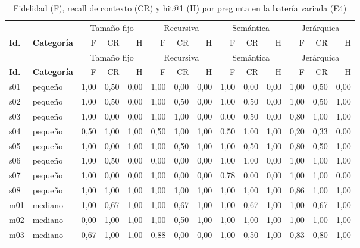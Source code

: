 \begin{footnotesize}
\setlength{\tabcolsep}{3pt}
\begin{longtable}{@{}l l rrr rrr rrr rrr@{}}
\caption{Fidelidad (F), recall de contexto (CR) y hit@1 (H) por pregunta en la batería variada (E4)}\label{tab:ap-e4}\\
\toprule
& & \multicolumn{3}{c}{Tamaño fijo} & \multicolumn{3}{c}{Recursiva} & \multicolumn{3}{c}{Semántica} & \multicolumn{3}{c}{Jerárquica} \\
\cmidrule(lr){3-5}\cmidrule(lr){6-8}\cmidrule(lr){9-11}\cmidrule(lr){12-14}
\textbf{Id.} & \textbf{Categoría} & F & CR & H & F & CR & H & F & CR & H & F & CR & H \\
\midrule
\endfirsthead
\toprule
& & \multicolumn{3}{c}{Tamaño fijo} & \multicolumn{3}{c}{Recursiva} & \multicolumn{3}{c}{Semántica} & \multicolumn{3}{c}{Jerárquica} \\
\cmidrule(lr){3-5}\cmidrule(lr){6-8}\cmidrule(lr){9-11}\cmidrule(lr){12-14}
\textbf{Id.} & \textbf{Categoría} & F & CR & H & F & CR & H & F & CR & H & F & CR & H \\
\midrule
\endhead
s01 & pequeño & 1,00 & 0,50 & 0,00 & 1,00 & 0,00 & 0,00 & 1,00 & 0,00 & 0,00 & 1,00 & 0,50 & 0,00 \\
s02 & pequeño & 1,00 & 0,50 & 0,00 & 1,00 & 0,50 & 0,00 & 1,00 & 0,50 & 0,00 & 1,00 & 0,50 & 1,00 \\
s03 & pequeño & 1,00 & 0,00 & 0,00 & 1,00 & 1,00 & 0,00 & 0,00 & 0,50 & 0,00 & 0,80 & 1,00 & 1,00 \\
s04 & pequeño & 0,50 & 1,00 & 1,00 & 0,50 & 1,00 & 1,00 & 0,50 & 1,00 & 1,00 & 0,20 & 0,33 & 0,00 \\
s05 & pequeño & 1,00 & 0,00 & 1,00 & 1,00 & 0,50 & 1,00 & 1,00 & 0,50 & 1,00 & 0,80 & 0,50 & 1,00 \\
s06 & pequeño & 1,00 & 0,50 & 0,00 & 0,00 & 0,00 & 0,00 & 1,00 & 1,00 & 0,00 & 1,00 & 1,00 & 1,00 \\
s07 & pequeño & 1,00 & 0,00 & 0,00 & 1,00 & 0,00 & 0,00 & 0,78 & 0,00 & 0,00 & 1,00 & 1,00 & 0,00 \\
s08 & pequeño & 1,00 & 1,00 & 1,00 & 1,00 & 1,00 & 1,00 & 1,00 & 1,00 & 1,00 & 0,86 & 1,00 & 1,00 \\
m01 & mediano & 1,00 & 0,67 & 1,00 & 1,00 & 0,67 & 1,00 & 1,00 & 0,67 & 1,00 & 1,00 & 0,67 & 1,00 \\
m02 & mediano & 0,00 & 1,00 & 1,00 & 1,00 & 0,50 & 1,00 & 1,00 & 1,00 & 1,00 & 1,00 & 1,00 & 1,00 \\
m03 & mediano & 0,67 & 1,00 & 1,00 & 0,88 & 0,00 & 0,00 & 1,00 & 0,50 & 1,00 & 0,83 & 0,80 & 1,00 \\

\end{longtable}
\end{footnotesize}
